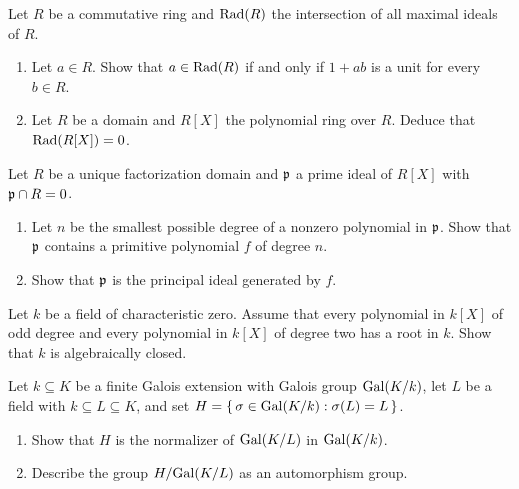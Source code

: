 \begin{problem}
  Let \(R\) be a commutative ring and \(\operatorname{Rad}(R)\) the intersection of all
  maximal ideals of \(R\).
  \begin{enumerate}[label=(\alph*)]
  \item Let \(a\in R\). Show that \(a\in\operatorname{Rad}(R)\) if and only if \(1+ab\)
    is a unit for every \(b\in R\).
  \item Let \(R\) be a domain and \(R[X]\) the polynomial ring over
    \(R\). Deduce that \(\operatorname{Rad}(R[X])=0\).
  \end{enumerate}
\end{problem}
\begin{solution}
\end{solution}

\begin{problem}
  Let \(R\) be a unique factorization domain and \(\mathfrak{p}\) a prime ideal
  of \(R[X]\) with \(\mathfrak{p}\cap R=0\).
  \begin{enumerate}[label=(\alph*)]
  \item Let \(n\) be the smallest possible degree of a nonzero polynomial
    in \(\mathfrak{p}\). Show that \(\mathfrak{p}\) contains a primitive polynomial
    \(f\) of degree \(n\).
  \item Show that \(\mathfrak{p}\) is the principal ideal generated by \(f\).
  \end{enumerate}
\end{problem}
\begin{solution}
\end{solution}

\begin{problem}
  Let \(k\) be a field of characteristic zero. Assume that every polynomial
  in \(k[X]\) of odd degree and every polynomial in \(k[X]\) of degree two
  has a root in \(k\). Show that \(k\) is algebraically closed.
\end{problem}
\begin{solution}
\end{solution}

\begin{problem}
  Let \(k\subseteq K\) be a finite Galois extension with Galois group
  \(\operatorname{Gal}(K/k)\), let \(L\) be a field with \( k\subseteq L\subseteq K\),
  and set \(H=\left\{\,\sigma\in\operatorname{Gal}(K/k):\sigma(L)=L\,\right\}\).
  \begin{enumerate}[label=(\alph*)]
  \item Show that \(H\) is the normalizer of \(\operatorname{Gal}(K/L)\) in
    \(\operatorname{Gal}(K/k)\).
  \item Describe the group \(H/{\operatorname{Gal}(K/L)}\) as an automorphism group.
  \end{enumerate}
\end{problem}
\begin{solution}
\end{solution}


